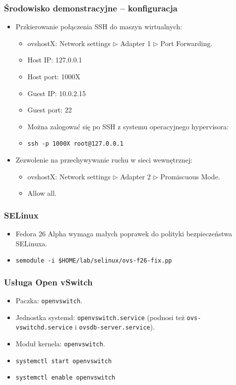 \documentclass[dvipsnames,table]{beamer}
\newcommand{\tri}{$\triangleright$ }
\begin{document}
\begin{frame}
\frametitle{Środowisko demonstracyjne -- konfiguracja}
\begin{itemize}
	\item Przkierowanie połączenia SSH do maszyn wirtualnych:
	\begin{itemize}
		\item ovshostX: Network settings \tri Adapter 1 \tri Port Forwarding.
		\item Host IP: 127.0.0.1
		\item Host port: 1000X
		\item Guest IP: 10.0.2.15
		\item Guest port: 22
		\item Można zalogować się po SSH z systemu operacyjnego hypervisora:
		\item {\tt ssh -p 1000X root@127.0.0.1}
	\end{itemize}
	\item Zezwolenie na przechywywanie ruchu w sieci wewnętrznej:
	\begin{itemize}
		\item ovshostX: Network settings \tri Adapter 2 \tri Promiscuous Mode.
		\item Allow all. 
	\end{itemize}
\end{itemize}
\end{frame}

\begin{frame}
\frametitle{SELinux}
\begin{itemize}
	\item Fedora 26 Alpha wymaga małych poprawek do polityki bezpieczeństwa SELinuxa.
	\item {\tt semodule -i \$HOME/lab/selinux/ovs-f26-fix.pp}
\end{itemize}	
\end{frame}

\begin{frame}
\frametitle{Usługa Open vSwitch}
\begin{itemize}
	\item Paczka: {\tt openvswitch}.
	\item Jednostka systemd: {\tt openvswitch.service} (podnosi też {\tt ovs-vswitchd.service} i {\tt ovsdb-server.service}).
	\item Moduł kernela: {\tt openvswitch}.
	\item {\tt systemctl start openvswitch}
	\item {\tt systemctl enable openvswitch}

\end{itemize}
\end{frame}
\end{document}
